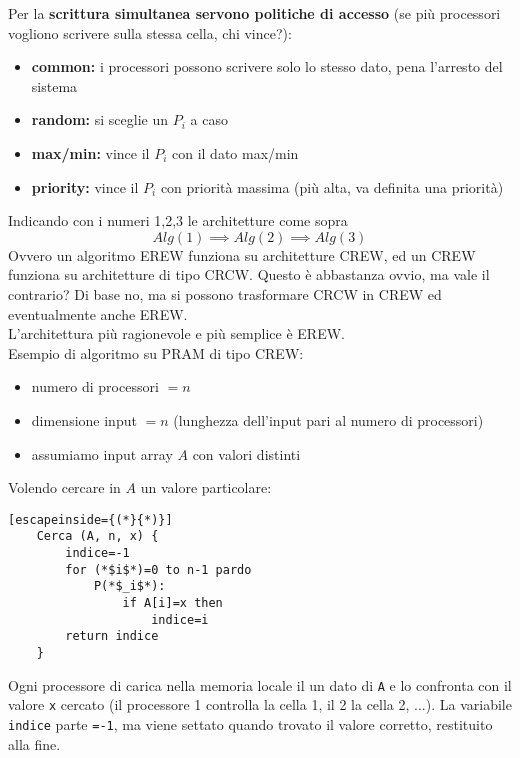 \newpage

Per la \textbf{scrittura simultanea servono politiche di accesso} (se più processori vogliono scrivere sulla stessa cella, chi vince?): 
\begin{itemize}
	\item \textbf{common:} i processori possono scrivere solo lo stesso dato, pena l'arresto del sistema
	\item \textbf{random:} si sceglie un $P_i$ a caso 
	\item \textbf{max/min:} vince il $P_i$ con il dato max/min
	\item \textbf{priority:} vince il $P_i$ con priorità massima (più alta, va definita una priorità)
\end{itemize}

Indicando con i numeri 1,2,3 le architetture come sopra
$$ Alg(1) \implies Alg(2) \implies Alg(3)$$
Ovvero un algoritmo EREW funziona su architetture CREW, ed un CREW funziona su architetture di tipo CRCW. Questo è abbastanza ovvio, ma vale il contrario? Di base no, ma si possono trasformare CRCW in CREW ed eventualmente anche EREW.\\

L'architettura più ragionevole e più semplice è EREW.\\

Esempio di algoritmo su PRAM di tipo CREW:
\begin{itemize}
	\item numero di processori $=n$
	\item dimensione input $=n$ (lunghezza dell'input pari al numero di processori)
	\item assumiamo input array $A$ con valori distinti
\end{itemize}

Volendo cercare in $A$ un valore particolare:
\begin{lstlisting}[escapeinside={(*}{*)}]
	Cerca (A, n, x) {
		indice=-1
		for (*$i$*)=0 to n-1 pardo 
			P(*$_i$*): 
				if A[i]=x then 
					indice=i
		return indice
	}
\end{lstlisting}

\newpage

Ogni processore di carica nella memoria locale il un dato di \texttt{A} e lo confronta con il valore \texttt{x} cercato (il processore 1 controlla la cella 1, il 2 la cella 2, ...). La variabile \texttt{indice} parte \texttt{=-1}, ma viene settato quando trovato il valore corretto, restituito alla fine.\\

